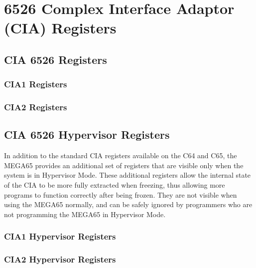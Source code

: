 \chapter{6526 Complex Interface Adaptor (CIA) Registers}

\section{CIA 6526 Registers}

\subsection*{CIA1 Registers}


\subsection*{CIA2 Registers}


\section{CIA 6526 Hypervisor Registers}

In addition to the standard CIA registers available on the C64 and C65, the MEGA65
provides an additional set of registers that are visible only when the system is in
Hypervisor Mode. These additional registers allow the internal state of the CIA to
be more fully extracted when freezing, thus allowing more programs to function
correctly after being frozen.  They are not visible when using the MEGA65 normally,
and can be safely ignored by programmers who are not programming the MEGA65 in
Hypervisor Mode.

\subsection*{CIA1 Hypervisor Registers}


\subsection*{CIA2 Hypervisor Registers}

